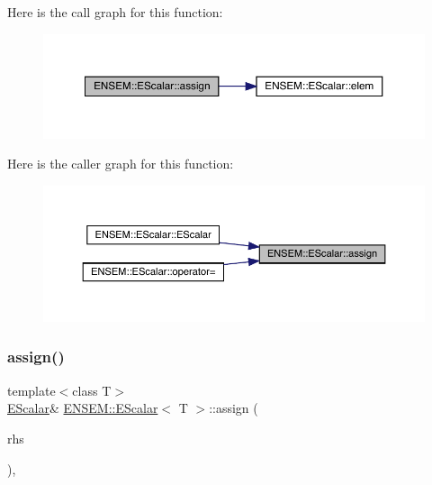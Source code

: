 Here is the call graph for this function\+:
\nopagebreak
\begin{figure}[H]
\begin{center}
\leavevmode
\includegraphics[width=350pt]{d0/d82/classENSEM_1_1EScalar_a9b88ad4d69d05f69b6483701487ddb74_cgraph}
\end{center}
\end{figure}
Here is the caller graph for this function\+:
\nopagebreak
\begin{figure}[H]
\begin{center}
\leavevmode
\includegraphics[width=350pt]{d0/d82/classENSEM_1_1EScalar_a9b88ad4d69d05f69b6483701487ddb74_icgraph}
\end{center}
\end{figure}
\mbox{\label{classENSEM_1_1EScalar_a9b88ad4d69d05f69b6483701487ddb74}} 
\subsubsection{\texorpdfstring{assign()}{assign()}\hspace{0.1cm}{\footnotesize\ttfamily [2/9]}}
{\footnotesize\ttfamily template$<$class T$>$ \\
\mbox{\hyperlink{classENSEM_1_1EScalar}{E\+Scalar}}\& \mbox{\hyperlink{classENSEM_1_1EScalar}{E\+N\+S\+E\+M\+::\+E\+Scalar}}$<$ T $>$\+::assign (\begin{DoxyParamCaption}\item[{const typename \mbox{\hyperlink{structENSEM_1_1WordType}{Word\+Type}}$<$ T $>$\+::Type\+\_\+t \&}]{rhs }\end{DoxyParamCaption})\hspace{0.3cm}{\ttfamily [inline]}, {\ttfamily [protected]}}



